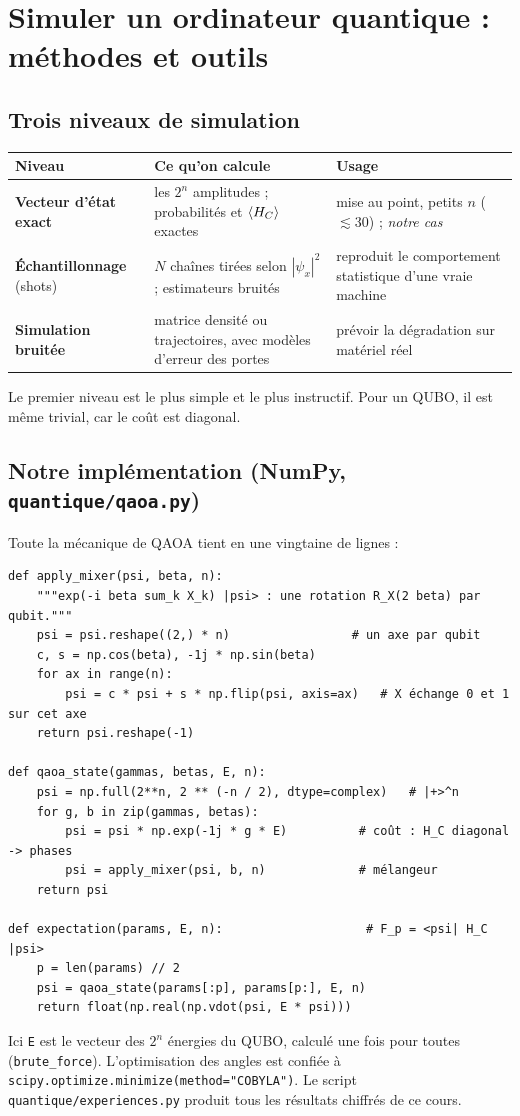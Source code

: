 \chapter{Simuler un ordinateur quantique : méthodes et outils}\label{ch:outils}

\section{Trois niveaux de simulation}
\begin{center}
\begin{tabular}{p{3.2cm}p{5.6cm}p{5.2cm}}
\toprule
Niveau & Ce qu'on calcule & Usage\\
\midrule
\textbf{Vecteur d'état exact} & les $2^n$ amplitudes ; probabilités et $\langle H_C\rangle$ exactes & mise au point, petits $n$ ($\lesssim30$) ; \emph{notre cas}\\
\textbf{Échantillonnage} (shots) & $N$ chaînes tirées selon $|\psi_x|^2$ ; estimateurs bruités & reproduit le comportement statistique d'une vraie machine\\
\textbf{Simulation bruitée} & matrice densité ou trajectoires, avec modèles d'erreur des portes & prévoir la dégradation sur matériel réel\\
\bottomrule
\end{tabular}
\end{center}
Le premier niveau est le plus simple et le plus instructif. Pour un QUBO, il est même trivial, car le coût est diagonal.

\section{Notre implémentation (NumPy, \texttt{quantique/qaoa.py})}
Toute la mécanique de QAOA tient en une vingtaine de lignes :
\begin{lstlisting}
def apply_mixer(psi, beta, n):
    """exp(-i beta sum_k X_k) |psi> : une rotation R_X(2 beta) par qubit."""
    psi = psi.reshape((2,) * n)                 # un axe par qubit
    c, s = np.cos(beta), -1j * np.sin(beta)
    for ax in range(n):
        psi = c * psi + s * np.flip(psi, axis=ax)   # X échange 0 et 1 sur cet axe
    return psi.reshape(-1)

def qaoa_state(gammas, betas, E, n):
    psi = np.full(2**n, 2 ** (-n / 2), dtype=complex)   # |+>^n
    for g, b in zip(gammas, betas):
        psi = psi * np.exp(-1j * g * E)          # coût : H_C diagonal -> phases
        psi = apply_mixer(psi, b, n)             # mélangeur
    return psi

def expectation(params, E, n):                    # F_p = <psi| H_C |psi>
    p = len(params) // 2
    psi = qaoa_state(params[:p], params[p:], E, n)
    return float(np.real(np.vdot(psi, E * psi)))
\end{lstlisting}
Ici \texttt{E} est le vecteur des $2^n$ énergies du QUBO, calculé une fois pour toutes (\texttt{brute\_force}). L'optimisation des angles est confiée à \texttt{scipy.optimize.minimize(method="COBYLA")}. Le script \texttt{quantique/experiences.py} produit tous les résultats chiffrés de ce cours.

